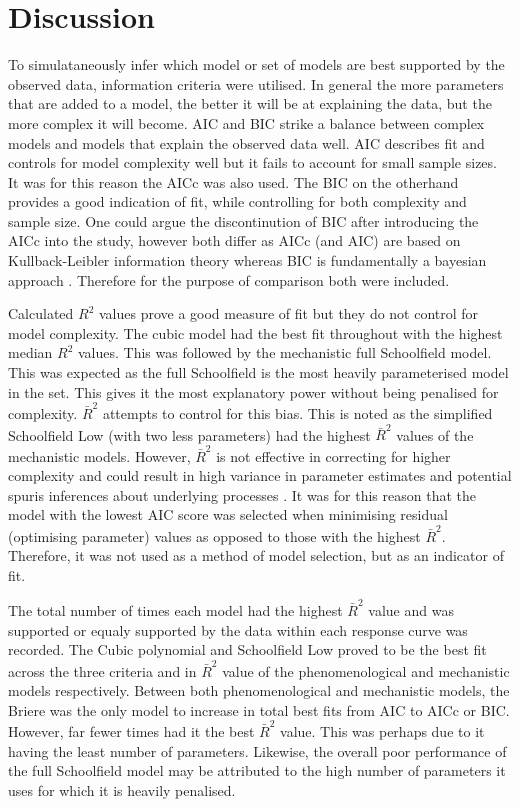 \documentclass[11pt]{article}
\begin{document}
	\newpage
	
	
	\section{Discussion}
	To simulataneously infer which model or set of models are best supported by the observed data, information criteria were utilised.  In general the more parameters that are added to a model, the better it will be at explaining the data, but the more complex it will become. AIC and BIC strike a balance between complex models and models that explain the observed data well. AIC describes fit and controls for model complexity well but it fails to account for small sample sizes. It was for this reason the AICc was also used. The BIC on the otherhand provides a good indication of fit, while controlling for both complexity and sample size. One could argue the discontinution of BIC after introducing the AICc into the study, however both differ as AICc (and AIC) are based on Kullback-Leibler information theory whereas BIC is fundamentally a bayesian approach \citep{johnson2004model}. Therefore for the purpose of comparison both were included. 
	
	Calculated \(R^2\) values prove a good measure of fit but they do not control for model complexity. The cubic model had the best fit throughout with the highest median \(R^2\) values. This was followed by the mechanistic full Schoolfield model. This was expected as the full Schoolfield is the most heavily parameterised model in the set. This gives it the most explanatory power without being penalised for complexity. \(\bar R^2\) attempts to control for this bias. This is noted as the simplified Schoolfield Low (with two less parameters) had the highest \(\bar R^2\) values of the mechanistic models. However, \(\bar R^2\) is not effective in correcting for higher complexity \citep{johnson2004model} and could result in high variance in parameter estimates and potential spuris inferences about underlying processes \citep{johnson2004model}. It was for this reason that the model with the lowest AIC score was selected when minimising residual (optimising parameter) values as opposed to those with the highest \(\bar R^2\). Therefore, it was not used as a method of model selection, but as an indicator of fit.
	
	The total number of times each model had the highest \(\bar R^2\) value and was supported or equaly supported by the data within each response curve was recorded. The Cubic polynomial and Schoolfield Low proved to be the best fit across the three criteria and in \(\bar R^2\) value of the phenomenological and mechanistic models respectively. Between both phenomenological and mechanistic models, the Briere was the only model to increase in total best fits from AIC to AICc or BIC. However, far fewer times had it the best \(\bar R^2\) value. This was perhaps due to it having the least number of parameters. Likewise, the overall poor performance of the full Schoolfield model may be attributed to the high number of parameters it uses for which it is heavily penalised.  
	
\end{document}
